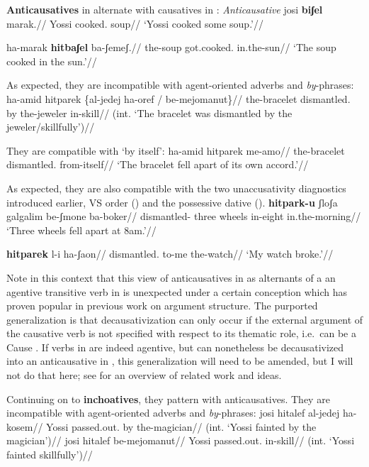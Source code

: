 \textbf{Anticausatives} in {\thit} alternate with causatives in {\tpie}:
\pex\label{ex:vz:anticaus-va}\textit{Anticausative}
	\a \begingl
		\gla josi \textbf{biʃel} marak.//
		\glb Yossi cooked. soup//
		\glft `Yossi cooked some soup.'//
	\endgl
	
	\a \begingl
		\gla ha-marak \textbf{hitbaʃel} ba-ʃemeʃ.//
		\glb the-soup got.cooked. in.the-sun//
		\glft `The soup cooked in the sun.'//
	\endgl
\xe

As expected, they are incompatible with agent-oriented adverbs and \emph{by}-phrases:
\ex \ljudge{*} \begingl
	\gla ha-{\ts}amid hitparek \{al-jedej ha-{\ts}oref / be-mejomanut\}//
	\glb the-bracelet dismantled. by the-jeweler {} in-skill//
	\glft (int. `The bracelet was dismantled by the jeweler/skillfully')//
	\endgl
\xe

They are compatible with `by itself':
\ex \begingl
	\gla ha-{\ts}amid hitparek me-a{\ts}mo//
	\glb the-bracelet dismantled. from-itself//
	\glft `The bracelet fell apart of its own accord.'//
	\endgl
\xe

As expected, they are also compatible with the two unaccusativity diagnostics introduced earlier,  VS order (\nextx) and the possessive dative (\anextx).
\ex\label{ex:vs-anticaus} \begingl
	\gla \textbf{hitpark-u} ʃloʃa galgalim be-ʃmone ba-boker//
	\glb dismantled- three wheels in-eight in.the-morning//
	\glft `Three wheels fell apart at 8am.'//
	\endgl
\xe

\ex
\begingl
\gla \textbf{hitparek} l-i ha-ʃaon//
\glb dismantled. to-me the-watch//
\glft `My watch broke.'//
\endgl
\xe

Note in this context that this view of anticausatives in {\thit} as alternants of a an agentive transitive verb in {\tpie} is unexpected under a certain conception which has proven popular in previous work on argument structure. The purported generalization is that decausativization can only occur if the external argument of the causative verb is not specified with respect to its thematic role, i.e.~can be a Cause \citep{unaccusativity95,reinhart02}. If verbs in {\tpie} are indeed agentive, but can nonetheless be decausativized into an anticausative in {\thit}, this generalization will need to be amended, but I will not do that here; see \citet[52]{layering15} for an overview of related work and ideas.


Continuing on to \textbf{inchoatives}, they pattern with anticausatives. They are incompatible with agent-oriented adverbs and \emph{by}-phrases:
\pex
		\a \ljudge{*} \begingl
			\gla josi hitalef al-jedej ha-kosem//
			\glb Yossi passed.out. by the-magician//
			\glft (int. `Yossi fainted by the magician')//
		\endgl
		\a {} \begingl
			\gla josi hitalef be-mejomanut//
			\glb Yossi passed.out. in-skill//
			\glft (int. `Yossi fainted skillfully')//
		\endgl
\xe

